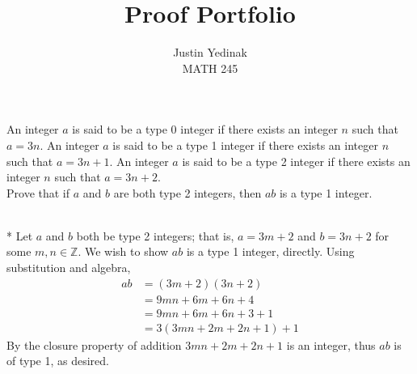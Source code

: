 \documentclass[10pt]{article}
\makeatletter
\newcommand{\Z}{\mathbb{Z}}
\newenvironment{question}[2][Question]{\begin{trivlist}
\item[\hskip \labelsep {\bfseries #1}\hskip \labelsep {\bfseries #2.}]}{\end{trivlist}}
\renewenvironment{proof}[1][\proofname]{\par
\pushQED{\qed}
\normalfont \topsep6\p@\@plus6\p@\relax
\trivlist
\item[\hskip\labelsep\itshape#1\@addpunct{.}]\mbox{}\\*}{\popQED\endtrivlist\@endpefalse}
\makeatother
\begin{document}
\title{Proof Portfolio}%
\author{Justin Yedinak\\ %
	MATH 245} %

\maketitle


\begin{question}{1}
	An integer $a$ is said to be a type 0 integer if there exists an integer $n$ such that $a = 3n$. An integer $a$ is said to be a type 1 integer if there exists an integer $n$ such that $a = 3n + 1$. An integer $a$ is said to be a type 2 integer if there exists an integer $n$ such that $a = 3n + 2$. \\ Prove that if $a$ and $b$ are both type 2 integers, then $ab$ is a type 1 integer.
	\begin{proof}
		Let $a$ and $b$ both be type 2 integers; that is, $a = 3m + 2$ and $b = 3 n + 2$ for some $m,n \in \Z$. We wish to show $ab$ is a type 1 integer, directly. Using substitution and algebra,
		\begin{align*}
			ab & =  (3 m + 2)(3 n + 2)        \\
			   & =  9mn + 6m + 6n +  4        \\
			   & =  9mn + 6m + 6n +  3 + 1    \\
			   & =  3(3mn + 2m + 2n +  1) + 1
		\end{align*}
		By the closure property of addition $3mn + 2m + 2n +  1$ is an integer, thus $ab$ is of type 1, as desired.
	\end{proof}
\end{question}
\end{document}
